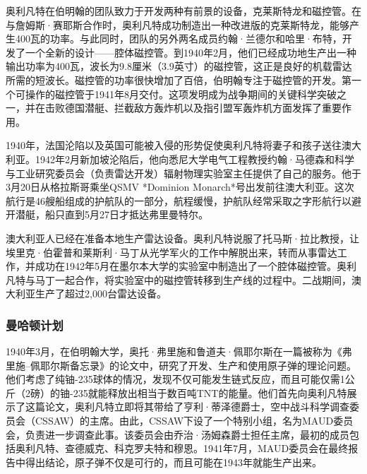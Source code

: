 奥利凡特在伯明翰的团队致力于开发两种有前景的设备，克莱斯特龙和磁控管。在与詹姆斯·赛耶斯合作时，奥利凡特成功制造出一种改进版的克莱斯特龙，能够产生400瓦的功率。与此同时，团队的另外两名成员约翰·兰德尔和哈里·布特，开发了一个全新的设计——腔体磁控管。到1940年2月，他们已经成功地生产出一种输出功率为400瓦，波长为9.8厘米（3.9英寸）的磁控管，这正是良好的机载雷达所需的短波长。磁控管的功率很快增加了百倍，伯明翰专注于磁控管的开发。第一个可操作的磁控管于1941年8月交付。这项发明成为战争期间的关键科学突破之一，并在击败德国潜艇、拦截敌方轰炸机以及指引盟军轰炸机方面发挥了重要作用。

1940年，法国沦陷以及英国可能被入侵的形势促使奥利凡特将妻子和孩子送往澳大利亚。1942年2月新加坡沦陷后，他向悉尼大学电气工程教授约翰·马德森和科学与工业研究委员会（负责雷达开发）辐射物理实验室主任提供了自己的服务。他于3月20日从格拉斯哥乘坐QSMV *Dominion Monarch*号出发前往澳大利亚。这次航行是46艘船组成的护航队的一部分，航程缓慢，护航队经常采取之字形航行以避开潜艇，船只直到5月27日才抵达弗里曼特尔。

澳大利亚人已经在准备本地生产雷达设备。奥利凡特说服了托马斯·拉比教授，让埃里克·伯霍普和莱斯利·马丁从光学军火的工作中解脱出来，转而从事雷达工作，并成功在1942年5月在墨尔本大学的实验室中制造出了一个腔体磁控管。奥利凡特与马丁一起合作，将实验室中的磁控管转移到生产线的过程中。二战期间，澳大利亚生产了超过2,000台雷达设备。
\subsubsection{曼哈顿计划}
1940年3月，在伯明翰大学，奥托·弗里施和鲁道夫·佩耶尔斯在一篇被称为《弗里施–佩耶尔斯备忘录》的论文中，研究了开发、生产和使用原子弹的理论问题。他们考虑了纯铀-235球体的情况，发现不仅可能发生链式反应，而且可能仅需1公斤（2磅）的铀-235就能释放出相当于数百吨TNT的能量。他们首先向奥利凡特展示了这篇论文，奥利凡特立即将其带给了亨利·蒂泽德爵士，空中战斗科学调查委员会（CSSAW）的主席。由此，CSSAW下设了一个特别小组，名为MAUD委员会，负责进一步调查此事。该委员会由乔治·汤姆森爵士担任主席，最初的成员包括奥利凡特、查德威克、科克罗夫特和穆恩。1941年7月，MAUD委员会在最终报告中得出结论，原子弹不仅是可行的，而且可能在1943年就能生产出来。
